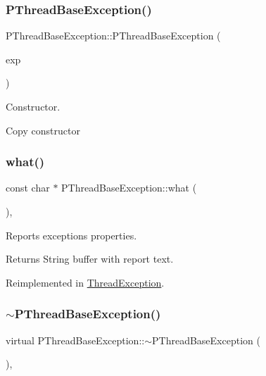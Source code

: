 \subsubsection{\texorpdfstring{P\+Thread\+Base\+Exception()}{PThreadBaseException()}\hspace{0.1cm}{\footnotesize\ttfamily [2/2]}}
{\footnotesize\ttfamily P\+Thread\+Base\+Exception\+::\+P\+Thread\+Base\+Exception (\begin{DoxyParamCaption}\item[{const \hyperlink{classPThreadBaseException}{P\+Thread\+Base\+Exception} \&}]{exp }\end{DoxyParamCaption})\hspace{0.3cm}{\ttfamily [inline]}}

Constructor.

Copy constructor \mbox{\label{group__EXCEPT__GROUP_ga4389169c01caec3fe93ac45a5d69a9ec}} 
\subsubsection{\texorpdfstring{what()}{what()}}
{\footnotesize\ttfamily const char $\ast$ P\+Thread\+Base\+Exception\+::what (\begin{DoxyParamCaption}{ }\end{DoxyParamCaption})\hspace{0.3cm}{\ttfamily [inline]}, {\ttfamily [virtual]}}

Reports exception\textquotesingle{}s properties. \begin{DoxyReturn}{Returns}
String buffer with report text. 
\end{DoxyReturn}


Reimplemented in \hyperlink{classThreadException_a3b8dcf8e441a9cba0539ca2455087e57}{Thread\+Exception}.

\mbox{\label{group__EXCEPT__GROUP_gae4edc60cd7923ef9305a1312cdbc9fc1}} 
\subsubsection{\texorpdfstring{$\sim$\+P\+Thread\+Base\+Exception()}{~PThreadBaseException()}}
{\footnotesize\ttfamily virtual P\+Thread\+Base\+Exception\+::$\sim$\+P\+Thread\+Base\+Exception (\begin{DoxyParamCaption}{ }\end{DoxyParamCaption})\hspace{0.3cm}{\ttfamily [inline]}, {\ttfamily [virtual]}}

